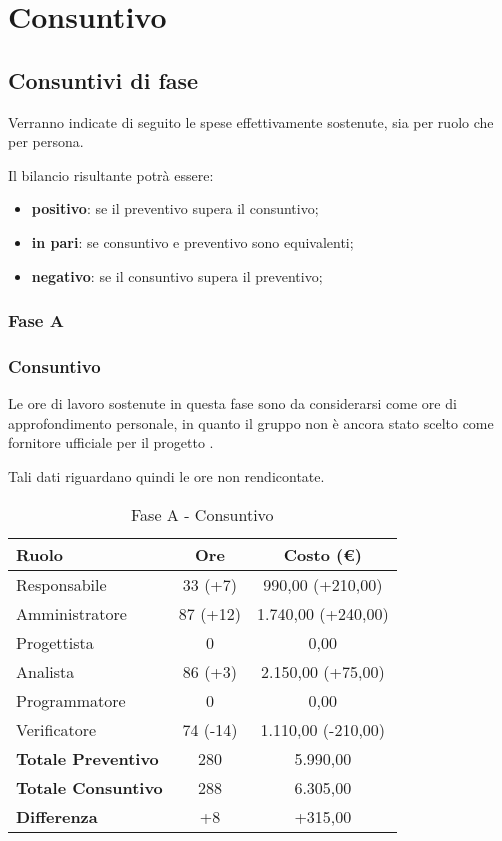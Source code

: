 \documentclass[../PianoProgetto.tex]{subfiles}
\begin{document}
\section{Consuntivo}


\subsection{Consuntivi di fase}

\label{sec:consuntivo}

	Verranno indicate di seguito le spese effettivamente sostenute, sia per ruolo che per persona.
	 
	Il bilancio risultante potrà essere: 
	\begin{itemize}
		\item \textbf{positivo}: se il preventivo supera il consuntivo;
		\item \textbf{in pari}: se consuntivo e preventivo sono equivalenti;
		\item \textbf{negativo}: se il consuntivo supera il preventivo;
	\end{itemize}

	\subsubsection{Fase A}
		\subsubsection{Consuntivo}
		Le ore di lavoro sostenute in questa fase sono da considerarsi come ore di approfondimento personale, in quanto il gruppo \leaf{} non è ancora stato scelto come fornitore ufficiale per il progetto \progetto.
		
		Tali dati riguardano quindi le ore non rendicontate.

		
\begin{table}[h]
		\centering
		\begin{tabular}{l * {2}{c}}
			\toprule
			\textbf{Ruolo} & \textbf{Ore} & \textbf{Costo (\euro{})} \\
			\midrule
			Responsabile &	33 (+7) & 990,00 (+210,00)\\
			Amministratore & 87 (+12) & 1.740,00 (+240,00)\\
			Progettista & 0 & 0,00 \\
			Analista & 86 (+3) & 2.150,00 (+75,00)\\
			Programmatore & 0 & 0,00 \\
			Verificatore & 74 (-14) & 1.110,00 (-210,00)\\
			\midrule
			\textbf{Totale Preventivo} & 280
 & 5.990,00
 \\		
			\textbf{Totale Consuntivo} & 288 & 6.305,00
 \\
			\midrule
			\textbf{Differenza} & +8 & +315,00 \\
			\bottomrule
		\end{tabular}
		
		\caption{Fase A - Consuntivo}
		\label{tab:consuntivoA}
		
	\end{table}		
		
\end{document}
